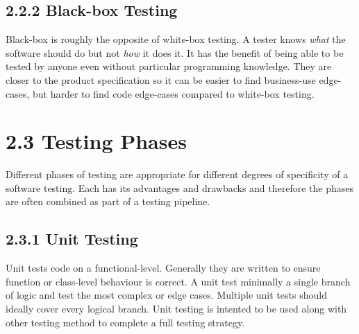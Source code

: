 \documentclass[12pt]{report}
\begin{document}
\subsection*{2.2.2 Black-box Testing}
\par\noindent
Black-box is roughly the opposite of white-box testing. A tester knows \textit{what} the software should do but not \textit{how} it does it. It has the benefit of being able to be tested by anyone even without particular programming knowledge. They are closer to the product specification so it can be easier to find business-use edge-cases, but harder to find code edge-cases compared to white-box testing.

\section*{2.3 Testing Phases}
\par\noindent
Different phases of testing are appropriate for different degrees of specificity of a software testing. Each has its advantages and drawbacks and therefore the phases are often combined as part of a testing pipeline.

\subsection*{2.3.1 Unit Testing}
\par\noindent
Unit tests code on a functional-level. Generally they are written to ensure function or class-level behaviour is correct. A unit test minimally a single branch of logic and test the most complex or edge cases. Multiple unit tests should ideally cover every logical branch. Unit testing is intented to be used along with other testing method to complete a full testing strategy.
\end{document}
